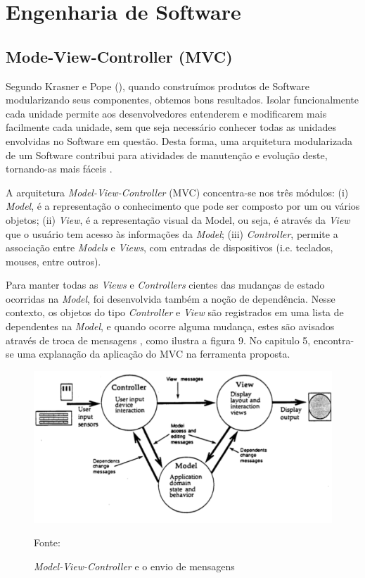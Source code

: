 \section{Engenharia de Software}
\subsection{Mode-View-Controller (MVC)}

Segundo Krasner e Pope (\citeyear{krasner1988}), quando construímos produtos de Software modularizando seus componentes, obtemos bons resultados. Isolar funcionalmente cada unidade permite aos desenvolvedores entenderem e modificarem mais facilmente cada unidade, sem que seja necessário conhecer todas as unidades envolvidas no Software em questão. Desta forma, uma arquitetura modularizada de um Software contribui para atividades de manutenção e evolução deste, tornando-as mais fáceis \cite[p. 1]{krasner1988}.


A arquitetura \textit{Model-View-Controller} (MVC) concentra-se nos três módulos: (i) \textit{Model}, é a representação o conhecimento que pode ser composto por um ou vários objetos; (ii) \textit{View}, é a representação visual da Model, ou seja, é através da \textit{View} que o usuário tem acesso às informações da \textit{Model}; (iii) \textit{Controller}, permite a associação entre \textit{Models} e \textit{Views}, com entradas de dispositivos (i.e. teclados, mouses, entre outros)\cite[p. 2]{krasner1988}.


Para manter todas as \textit{Views} e \textit{Controllers} cientes das mudanças de estado ocorridas na \textit{Model}, foi desenvolvida também a noção de dependência. Nesse contexto, os objetos do tipo \textit{Controller} e \textit{View} são registrados em uma lista de dependentes na \textit{Model}, e quando ocorre alguma mudança, estes são avisados através de troca de mensagens \cite[p. 2]{krasner1988}, como ilustra a figura 9. No capitulo 5, encontra-se uma explanação da aplicação do MVC na ferramenta proposta.

\begin{figure}[h!]
\centering
\label{f06}
\includegraphics[width=1\textwidth]{figuras/f06}
\caption{\textit{Model-View-Controller }e o envio de mensagens}{Fonte:\cite{krasner1988}}
\end{figure}
\FloatBarrier

